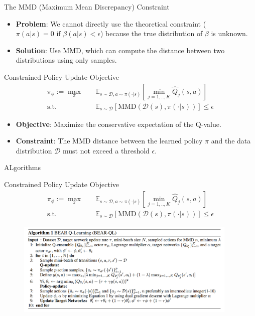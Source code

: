\documentclass[11pt]{beamer}
\newcommand{\mbb}[1]{\mathbb{#1}}
\newcommand{\mc}[1]{\mathcal{#1}}
\newcommand{\tb}[1]{\textbf{#1}}
\begin{document}
\begin{frame}{The MMD (Maximum Mean Discrepancy) Constraint}
    \begin{itemize}
        \item \tb{Problem}: We cannot directly use the theoretical constraint ($\pi(a|s)=0 \text{ if } \beta(a|s)<\epsilon$) because the true distribution of $\beta$ is unknown.
        \item \tb{Solution}: Use MMD, which can compute the distance between two distributions using only samples.
    \end{itemize}
    
    \begin{block}{Constrained Policy Update Objective}
    \begin{align*}
    \pi_\phi := \max_{\pi} \quad & \mbb{E}_{s \sim \mc{D}, a \sim \pi(\cdot|s)} \left[ \min_{j=1,..,K} \hat{Q}_j(s,a) \right] \\
    \text{s.t.} \quad & \mbb{E}_{s \sim \mc{D}} \left[ \text{MMD}(\mc{D}(s), \pi(\cdot|s)) \right] \leq \epsilon
    \end{align*}
    \end{block}

    \begin{itemize}
        \item \tb{Objective}: Maximize the conservative expectation of the Q-value.
        \item \tb{Constraint}: The MMD distance between the learned policy $\pi$ and the data distribution $\mc{D}$ must not exceed a threshold $\epsilon$.
    \end{itemize}
\end{frame}

\begin{frame}{ALgorithms}
    \begin{block}{Constrained Policy Update Objective}
        \begin{align*}
            \pi_\phi := \max_{\pi} \quad & \mbb{E}_{s \sim \mc{D}, a \sim \pi(\cdot|s)} \left[ \min_{j=1,..,K} \hat{Q}_j(s,a) \right] \\
            \text{s.t.} \quad & \mbb{E}_{s \sim \mc{D}} \left[ \text{MMD}(\mc{D}(s), \pi(\cdot|s)) \right] \leq \epsilon
        \end{align*}
    \end{block}
    \begin{figure}
        \includegraphics[width=0.94\textwidth]{Algorithm.png}
    \end{figure}
\end{frame}
\end{document}
